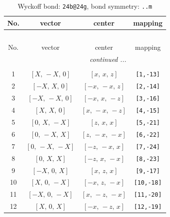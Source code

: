 \documentclass[fleqn,8pt]{jsarticle}
\begin{document}
\renewcommand{\arraystretch}{1.2}
\begin{longtable}{cccc}
\caption{Wyckoff bond: {\tt 24b@24g}, bond symmetry: {\tt ..m}}
 \\
 \hline \hline
No. & vector & center & mapping \\ \hline \endfirsthead

\multicolumn{3}{l}{\tablename\ \thetable{}} \\
 \hline \hline
No. & vector & center & mapping \\ \hline \endhead

 \hline \hline
\multicolumn{3}{r}{\footnotesize\it continued ...} \\ \endfoot

 \hline \hline
\multicolumn{3}{r}{} \\ \endlastfoot

1 & $\left[ X,\, - X,\, 0 \right]$ & $\left[ x,\, x,\, z \right]$ & {\tt [1,-13]} \\ \hline
2 & $\left[ - X,\, X,\, 0 \right]$ & $\left[ - x,\, - x,\, z \right]$ & {\tt [2,-14]} \\ \hline
3 & $\left[ - X,\, - X,\, 0 \right]$ & $\left[ - x,\, x,\, - z \right]$ & {\tt [3,-16]} \\ \hline
4 & $\left[ X,\, X,\, 0 \right]$ & $\left[ x,\, - x,\, - z \right]$ & {\tt [4,-15]} \\ \hline
5 & $\left[ 0,\, X,\, - X \right]$ & $\left[ z,\, x,\, x \right]$ & {\tt [5,-21]} \\ \hline
6 & $\left[ 0,\, - X,\, X \right]$ & $\left[ z,\, - x,\, - x \right]$ & {\tt [6,-22]} \\ \hline
7 & $\left[ 0,\, - X,\, - X \right]$ & $\left[ - z,\, - x,\, x \right]$ & {\tt [7,-24]} \\ \hline
8 & $\left[ 0,\, X,\, X \right]$ & $\left[ - z,\, x,\, - x \right]$ & {\tt [8,-23]} \\ \hline
9 & $\left[ - X,\, 0,\, X \right]$ & $\left[ x,\, z,\, x \right]$ & {\tt [9,-17]} \\ \hline
10 & $\left[ X,\, 0,\, - X \right]$ & $\left[ - x,\, z,\, - x \right]$ & {\tt [10,-18]} \\ \hline
11 & $\left[ - X,\, 0,\, - X \right]$ & $\left[ x,\, - z,\, - x \right]$ & {\tt [11,-20]} \\ \hline
12 & $\left[ X,\, 0,\, X \right]$ & $\left[ - x,\, - z,\, x \right]$ & {\tt [12,-19]} \\
\end{longtable}
\renewcommand{\arraystretch}{1.2}
\end{document}
